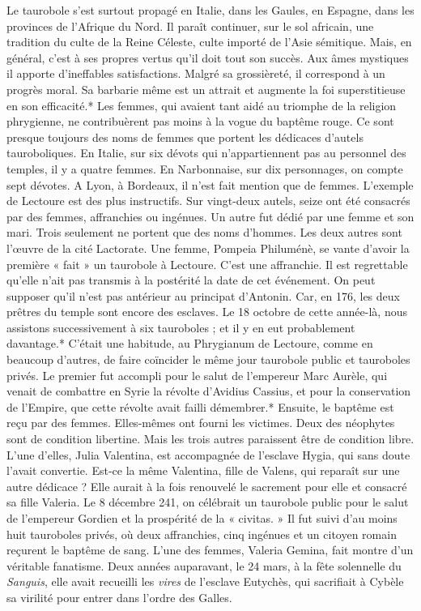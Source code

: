 \documentclass[a4paper, 11pt, oneside, polutonikogreek, french]{article}
\begin{document}
Le taurobole s'est surtout propagé en Italie, dans les Gaules, en Espagne, dans les provinces de l'Afrique du Nord. Il paraît continuer, sur le sol africain, une tradition du culte de la Reine Céleste, culte importé de l'Asie sémitique. Mais, en général, c'est à ses propres vertus qu'il doit tout son succès. Aux âmes mystiques il apporte d'ineffables satisfactions. Malgré sa grossièreté, il correspond à un progrès moral. Sa barbarie même est un attrait et augmente la foi superstitieuse en son efficacité.* Les femmes, qui avaient tant aidé au triomphe de la religion phrygienne, ne contribuèrent pas moins à la vogue du baptême rouge. Ce sont presque toujours des noms de femmes que portent les dédicaces d'autels tauroboliques. En Italie, sur six dévots qui n'appartiennent pas au personnel des temples, il y a quatre femmes. En Narbonnaise, sur dix personnages, on compte sept dévotes. A Lyon, à Bordeaux, il n'est fait mention que de femmes. L'exemple de Lectoure est des plus instructifs. Sur vingt-deux autels, seize ont été consacrés par des femmes, affranchies ou ingénues. Un autre fut dédié par une femme et son mari. Trois seulement ne portent que des noms d'hommes. Les deux autres sont l'œuvre de la cité Lactorate. Une femme, Pompeia Philuménè, se vante d'avoir la première « fait » un taurobole à Lectoure. C'est une affranchie. Il est regrettable qu'elle n'ait pas transmis à la postérité la date de cet événement. On peut supposer qu'il n'est pas antérieur au principat d'Antonin. Car, en 176, les deux prêtres du temple sont encore des esclaves. Le 18 octobre de cette année-là, nous assistons successivement à six tauroboles ; et il y en eut probablement davantage.* C'était une habitude, au Phrygianum de Lectoure, comme en beaucoup d'autres, de faire coïncider le même jour taurobole public et tauroboles privés. Le premier fut accompli pour le salut de l'empereur Marc Aurèle, qui venait de combattre en Syrie la révolte d'Avidius Cassius, et pour la conservation de l'Empire, que cette révolte avait failli démembrer.* Ensuite, le baptême est reçu par des femmes. Elles-mêmes ont fourni les victimes. Deux des néophytes sont de condition libertine. Mais les trois autres paraissent être de condition libre. L'une d'elles, Julia Valentina, est accompagnée de l'esclave Hygia, qui sans doute l'avait convertie. Est-ce la même Valentina, fille de Valens, qui reparaît sur une autre dédicace ? Elle aurait à la fois renouvelé le sacrement pour elle et consacré sa fille Valeria. Le 8 décembre 241, on célébrait un taurobole public pour le salut de l'empereur Gordien et la prospérité de la « civitas. » Il fut suivi d'au moins huit tauroboles privés, où deux affranchies, cinq ingénues et un citoyen romain reçurent le baptême de sang. L'une des femmes, Valeria Gemina, fait montre d'un véritable fanatisme. Deux années auparavant, le 24 mars, à la fête solennelle du \emph{Sanguis}, elle avait recueilli les \emph{vires} de l'esclave Eutychès, qui sacrifiait à Cybèle sa virilité pour entrer dans l'ordre des Galles.
\end{document}
